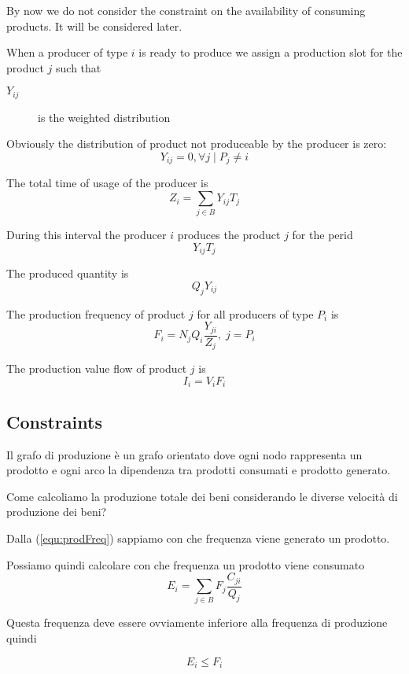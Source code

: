 \documentclass[a4paper,11pt]{article}
\begin{document}
By now we do not consider the constraint on the availability of consuming products. It will be considered later.

When a producer of type $ i $ is ready to produce we assign a production slot for the product $ j $ such that
\begin{description}
	\item[ $ Y_{ij} $ ] is the weighted distribution
\end{description}

Obviously the distribution of product not produceable by the producer is zero:
\begin{equation}
	\label{equ:distribution}
	Y_{ij} = 0, \forall j \; | \; P_j \ne i
\end{equation}

The total time of usage of the producer is
\begin{equation}
	Z_i = \sum_{j \in B} Y_{ij} T_j
\end{equation}

During this interval the producer $ i $ produces the product $ j $ for the perid
	\[ Y_{ij} T_j \]

The produced quantity is
	\[ Q_j Y_{ij} \]
	
The production frequency of product $ j $ for all producers of type $ P_i $ is
\begin{equation}
	\label{equ:prodFreq}
	F_i = N_j Q_i \frac{Y_{ji}}{Z_j}, \; j = P_i
\end{equation}

The production value flow of product $ j $ is 
\begin{equation}
	I_i = V_i F_i
\end{equation}

\subsection{Constraints}

Il grafo di produzione è un grafo orientato dove
ogni nodo rappresenta un prodotto e ogni arco la dipendenza tra prodotti consumati e prodotto generato.

Come calcoliamo la produzione totale dei beni considerando le diverse velocità di produzione dei beni?

Dalla (\ref{equ:prodFreq}) sappiamo con che frequenza viene generato un prodotto.

Possiamo quindi calcolare con che frequenza un prodotto viene consumato
\begin{equation}
	E_i = \sum_{j \in B} F_j \frac{C_{ji}}{Q_j}
\end{equation}

Questa frequenza deve essere ovviamente inferiore alla frequenza di produzione quindi

\begin{equation}
	E_i \le F_i
\end{equation}
\end{document}
